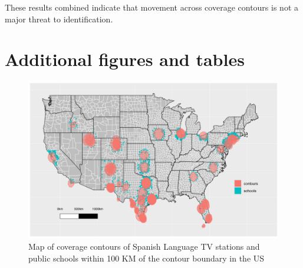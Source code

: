 \documentclass[11pt]{article}
\begin{document}
These results combined indicate that movement across coverage contours is not a major threat to identification. 


\clearpage

\section{Additional figures and tables}

\begin{figure}[!hbtp]
\centering
\caption{Map of coverage contours of Spanish Language TV stations and public schools within 100 KM of the contour boundary in the US}\label{f:contours_schools_inside}
\includegraphics[width=14.4cm]{../../analysis/Output/img/Schools_inside2.pdf}
\end{figure} 


\end{document}

